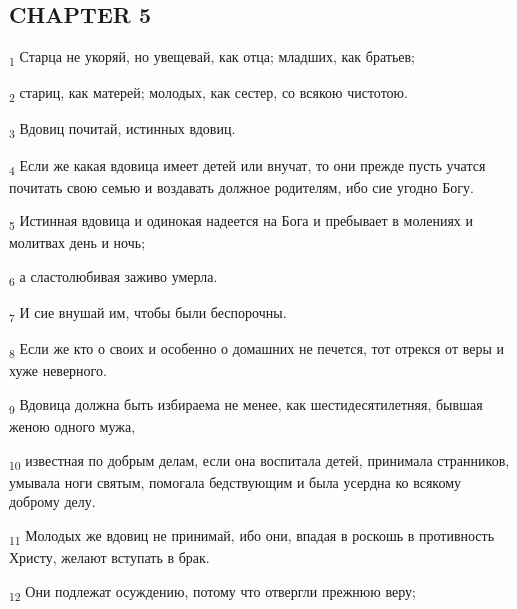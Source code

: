 \subsection{CHAPTER 5}
\begin{tcolorbox}
\textsubscript{1} Старца не укоряй, но увещевай, как отца; младших, как братьев;
\end{tcolorbox}
\begin{tcolorbox}
\textsubscript{2} стариц, как матерей; молодых, как сестер, со всякою чистотою.
\end{tcolorbox}
\begin{tcolorbox}
\textsubscript{3} Вдовиц почитай, истинных вдовиц.
\end{tcolorbox}
\begin{tcolorbox}
\textsubscript{4} Если же какая вдовица имеет детей или внучат, то они прежде пусть учатся почитать свою семью и воздавать должное родителям, ибо сие угодно Богу.
\end{tcolorbox}
\begin{tcolorbox}
\textsubscript{5} Истинная вдовица и одинокая надеется на Бога и пребывает в молениях и молитвах день и ночь;
\end{tcolorbox}
\begin{tcolorbox}
\textsubscript{6} а сластолюбивая заживо умерла.
\end{tcolorbox}
\begin{tcolorbox}
\textsubscript{7} И сие внушай им, чтобы были беспорочны.
\end{tcolorbox}
\begin{tcolorbox}
\textsubscript{8} Если же кто о своих и особенно о домашних не печется, тот отрекся от веры и хуже неверного.
\end{tcolorbox}
\begin{tcolorbox}
\textsubscript{9} Вдовица должна быть избираема не менее, как шестидесятилетняя, бывшая женою одного мужа,
\end{tcolorbox}
\begin{tcolorbox}
\textsubscript{10} известная по добрым делам, если она воспитала детей, принимала странников, умывала ноги святым, помогала бедствующим и была усердна ко всякому доброму делу.
\end{tcolorbox}
\begin{tcolorbox}
\textsubscript{11} Молодых же вдовиц не принимай, ибо они, впадая в роскошь в противность Христу, желают вступать в брак.
\end{tcolorbox}
\begin{tcolorbox}
\textsubscript{12} Они подлежат осуждению, потому что отвергли прежнюю веру;
\end{tcolorbox}
